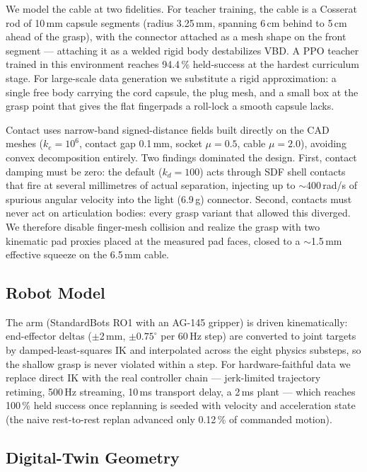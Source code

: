 We model the cable at two fidelities. For teacher training, the cable
is a Cosserat rod of 10\,mm capsule segments (radius 3.25\,mm,
spanning 6\,cm behind to 5\,cm ahead of the grasp), with the
connector attached as a mesh shape on the front segment ---
attaching it as a welded rigid body destabilizes VBD. A PPO teacher
trained in this environment reaches 94.4\,\% held-success at the
hardest curriculum stage. For large-scale data generation we
substitute a rigid approximation: a single free body carrying the
cord capsule, the plug mesh, and a small box at the grasp point that
gives the flat fingerpads a roll-lock a smooth capsule lacks.

Contact uses narrow-band signed-distance fields built directly on
the CAD meshes ($k_e = 10^{6}$, contact gap 0.1\,mm, socket
$\mu = 0.5$, cable $\mu = 2.0$), avoiding convex decomposition
entirely. Two findings dominated the design.
\textcolor{cmured}{First}, contact damping must be zero: the default
($k_d = 100$) acts through SDF shell contacts that fire at several
millimetres of actual separation, injecting up to
$\sim$400\,rad/s of spurious angular velocity into the light
(6.9\,g) connector. \textcolor{cmured}{Second}, contacts must never
act on articulation bodies: every grasp variant that allowed this
diverged. We therefore disable finger-mesh collision and realize the
grasp with two kinematic pad proxies placed at the measured pad
faces, closed to a $\sim$1.5\,mm effective squeeze on the 6.5\,mm
cable.

\subsection{Robot Model}

The arm (StandardBots RO1 with an AG-145 gripper) is driven
kinematically: end-effector deltas ($\pm$2\,mm, $\pm 0.75^{\circ}$
per 60\,Hz step) are converted to joint targets by
damped-least-squares IK and interpolated across the eight physics
substeps, so the shallow grasp is never violated within a step. For
hardware-faithful data we replace direct IK with the real controller
chain --- jerk-limited trajectory retiming, 500\,Hz streaming,
10\,ms transport delay, a 2\,ms plant --- which reaches 100\,\% held
success once
replanning is seeded with velocity and acceleration state (the naive
rest-to-rest replan advanced only 0.12\,\% of commanded motion).

\subsection{Digital-Twin Geometry}

